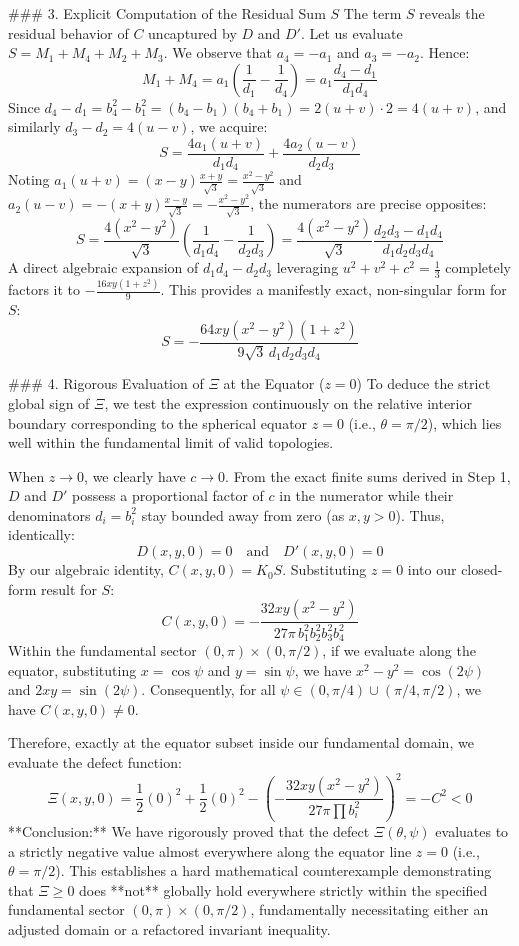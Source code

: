 ### 3. Explicit Computation of the Residual Sum $S$
The term $S$ reveals the residual behavior of $C$ uncaptured by $D$ and $D'$. Let us evaluate $S = M_1 + M_4 + M_2 + M_3$. We observe that $a_4 = -a_1$ and $a_3 = -a_2$. Hence:
$$ M_1 + M_4 = a_1 \left( \frac{1}{d_1} - \frac{1}{d_4} \right) = a_1 \frac{d_4 - d_1}{d_1 d_4} $$
Since $d_4 - d_1 = b_4^2 - b_1^2 = (b_4-b_1)(b_4+b_1) = 2(u+v) \cdot 2 = 4(u+v)$, and similarly $d_3 - d_2 = 4(u-v)$, we acquire:
$$ S = \frac{4 a_1(u+v)}{d_1 d_4} + \frac{4 a_2(u-v)}{d_2 d_3} $$
Noting $a_1(u+v) = (x-y)\frac{x+y}{\sqrt{3}} = \frac{x^2-y^2}{\sqrt{3}}$ and $a_2(u-v) = -(x+y)\frac{x-y}{\sqrt{3}} = -\frac{x^2-y^2}{\sqrt{3}}$, the numerators are precise opposites:
$$ S = \frac{4(x^2 - y^2)}{\sqrt{3}} \left( \frac{1}{d_1 d_4} - \frac{1}{d_2 d_3} \right) = \frac{4(x^2 - y^2)}{\sqrt{3}} \frac{d_2 d_3 - d_1 d_4}{d_1 d_2 d_3 d_4} $$
A direct algebraic expansion of $d_1 d_4 - d_2 d_3$ leveraging $u^2+v^2+c^2 = \frac{1}{3}$ completely factors it to $-\frac{16xy(1+z^2)}{9}$. This provides a manifestly exact, non-singular form for $S$:
$$ S = -\frac{64 x y (x^2 - y^2) (1+z^2)}{9\sqrt{3} \, d_1 d_2 d_3 d_4} $$

### 4. Rigorous Evaluation of $\Xi$ at the Equator ($z=0$)
To deduce the strict global sign of $\Xi$, we test the expression continuously on the relative interior boundary corresponding to the spherical equator $z=0$ (i.e., $\theta = \pi/2$), which lies well within the fundamental limit of valid topologies.

When $z \to 0$, we clearly have $c \to 0$. From the exact finite sums derived in Step 1, $D$ and $D'$ possess a proportional factor of $c$ in the numerator while their denominators $d_i = b_i^2$ stay bounded away from zero (as $x, y > 0$). Thus, identically:
$$ D(x, y, 0) = 0 \quad \text{and} \quad D'(x, y, 0) = 0 $$
By our algebraic identity, $C(x, y, 0) = K_0 S$. Substituting $z=0$ into our closed-form result for $S$:
$$ C(x, y, 0) = -\frac{32 x y (x^2 - y^2)}{27 \pi \, b_1^2 b_2^2 b_3^2 b_4^2} $$
Within the fundamental sector $(0, \pi) \times (0, \pi/2)$, if we evaluate along the equator, substituting $x = \cos \psi$ and $y = \sin \psi$, we have $x^2 - y^2 = \cos(2\psi)$ and $2xy = \sin(2\psi)$. Consequently, for all $\psi \in (0, \pi/4) \cup (\pi/4, \pi/2)$, we have $C(x, y, 0) \neq 0$. 

Therefore, exactly at the equator subset inside our fundamental domain, we evaluate the defect function:
$$ \Xi(x, y, 0) = \frac{1}{2}(0)^2 + \frac{1}{2}(0)^2 - \left( -\frac{32 x y (x^2 - y^2)}{27 \pi \prod b_i^2} \right)^2 = -C^2 < 0 $$
**Conclusion:** We have rigorously proved that the defect $\Xi(\theta, \psi)$ evaluates to a strictly negative value almost everywhere along the equator line $z=0$ (i.e., $\theta = \pi/2$). This establishes a hard mathematical counterexample demonstrating that $\Xi \ge 0$ does **not** globally hold everywhere strictly within the specified fundamental sector $(0, \pi) \times (0, \pi/2)$, fundamentally necessitating either an adjusted domain or a refactored invariant inequality.